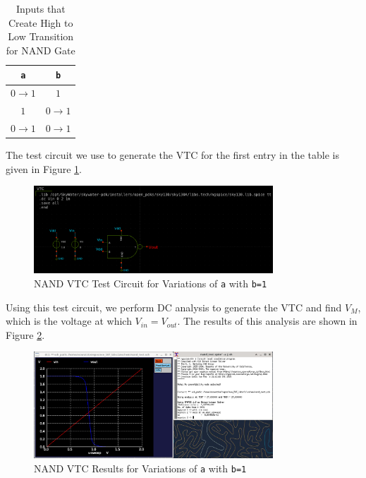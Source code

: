 \documentclass{article}
\begin{document}
	\begin{table}[H]
	\begin{center}
	\caption{Inputs that Create High to Low Transition for NAND Gate}
	\label{table::nand_gate_high_to_low_transitions}
	\begin{tabular}{| c | c |}
		\hline
		\texttt{a} & \texttt{b} \\
		\hline	
		$0 \rightarrow 1$ & $1$\\
		\hline	
		$1$ & $0 \rightarrow 1$\\
		\hline	
		$0 \rightarrow 1$ & $0 \rightarrow 1$\\
		\hline
	\end{tabular}
	\end{center}
	\end{table}
	
	\noindent The test circuit we use to generate the VTC for the first entry in the table is given in Figure \ref{fig::nand_vtc_test_sweep_va}.
	
	\begin{figure}[H]
		\centerline{\includegraphics[width=0.8\textwidth]{nand_vtc_test_sweep_va.png}}
		\caption{NAND VTC Test Circuit for Variations of \texttt{a} with \texttt{b=1}}
		\label{fig::nand_vtc_test_sweep_va}
	\end{figure}	
	
	\noindent Using this test circuit, we perform DC analysis to generate the VTC and find $V_M$, which is the voltage at which $V_{in} = V_{out}$. The results of this analysis are shown in Figure \ref{fig::nand_vtc_sweep_va}.
	
	\begin{figure}[H]
		\centerline{\includegraphics[width=0.8\textwidth]{nand_vtc_sweep_va.png}}
		\caption{NAND VTC Results for Variations of \texttt{a} with \texttt{b=1}}
		\label{fig::nand_vtc_sweep_va}
	\end{figure}
	
\end{document}

